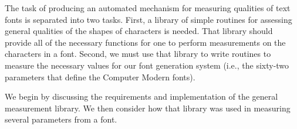 
The task of producing an automated mechanism for measuring qualities of text
fonts is separated into two tasks. First, a library of simple routines for
assessing general qualities of the shapes of characters is needed. That library
should provide all of the necessary functions for one to perform measurements on
the characters in a font. Second, we must use that library to write routines to
measure the necessary values for our font generation system (i.e., the sixty-two
parameters that define the Computer Modern fonts).

We begin by discussing the requirements and implementation of the general
measurement library. We then consider how that library was used in measuring
several parameters from a font.

